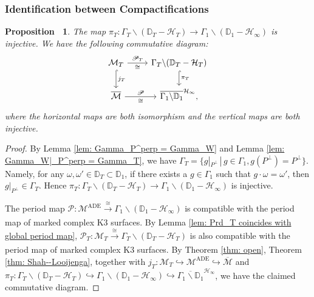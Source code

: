 \documentclass[12pt,reqno,a4paper]{amsart}
\newtheorem{prop}[thm]{Proposition~}
\theoremstyle{remark}
\theoremstyle{definition}
\begin{document}
\subsubsection{Identification between Compactifications}
\begin{prop}
\label{prop: comm diag, open to compact}
    The map $\pi_T\colon\Gamma_T\backslash(\mathbb{D}_T-\mathcal{H}_T)\to\Gamma_1\backslash(\mathbb{D}_1-\mathcal{H}_\infty)$ is injective.
    We have the following commutative diagram:
    \begin{equation*}
    \begin{tikzcd}
      \mathcal{M}_T  \arrow[r,"\mathscr{P}_T","\cong"'] \arrow[d,hook,"j_T"] & \Gamma_T\backslash(\mathbb{D}_T-\mathcal{H}_T) \arrow[d,hook,"\pi_T"] \\
      \overline{\mathcal{M}} \arrow[r,"\mathscr{P}","\cong"'] & \overline{\Gamma_1\backslash\mathbb{D}_1}^{\mathcal{H}_\infty},
    \end{tikzcd}
    \end{equation*}
    where the horizontal maps are both isomorphism and the vertical maps are both injective.
\end{prop}
\begin{proof}
    By Lemma \ref{lem: Gamma_P^perp = Gamma_W} and Lemma \ref{lem: Gamma_W|_P^perp = Gamma_T}, we have $\Gamma_T = \{ g|_{P^\perp} \,|\, g\in\Gamma_1, g(P^\perp)=P^\perp \}$.
    Namely, for any $\omega,\omega'\in\mathbb{D}_T\subset\mathbb{D}_1$, if there exists a $g\in\Gamma_1$ such that $g\cdot\omega=\omega'$, then $g|_{P^\perp}\in\Gamma_T$.
    Hence $\pi_T\colon\Gamma_T\backslash(\mathbb{D}_T-\mathcal{H}_T)\to\Gamma_1\backslash(\mathbb{D}_1-\mathcal{H}_\infty)$ is injective.
    
    The period map $\mathscr{P}\colon\mathcal{M}^{\mathrm{ADE}}\xrightarrow[]{\cong}\Gamma_1\backslash(\mathbb{D}_1-\mathcal{H}_\infty)$ is compatible with the period map of marked complex K3 surfaces.
    By Lemma \ref{lem: Prd_T coincides with global period map}, $\mathscr{P}_T\colon\mathcal{M}_T\xrightarrow[]{\cong}\Gamma_T\backslash(\mathbb{D}_T-\mathcal{H}_T)$ is also compatible with the period map of marked complex K3 surfaces.
    By Theorem \ref{thm: open}, Theorem \ref{thm: Shah--Looijenga}, together with $j_T\colon \mathcal{M}_T\hookrightarrow\mathcal{M}^{\mathrm{ADE}}\hookrightarrow\overline{\mathcal{M}}$ and $\pi_T\colon \Gamma_T\backslash(\mathbb{D}_T-\mathcal{H}_T)\hookrightarrow\Gamma_1\backslash(\mathbb{D}_1-\mathcal{H}_\infty)\hookrightarrow\overline{\Gamma_1\backslash\mathbb{D}_1}^{\mathcal{H}_\infty}$, we have the claimed commutative diagram.
\end{proof}
\end{document}
